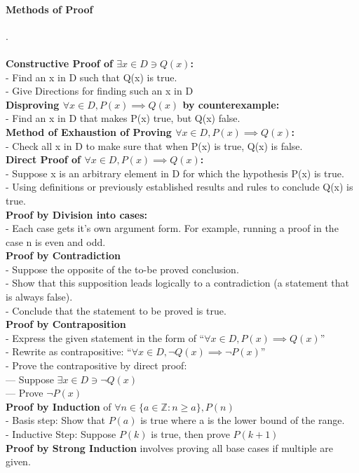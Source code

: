 \documentclass[10pt,letterpaper]{article}
\begin{document}
\begin{multicols}{2}
\paragraph{Methods of Proof}.\\\\
\textbf{Constructive Proof of $\exists x\in D \ni Q(x)$:}\\
- Find an x in D such that Q(x) is true.\\
- Give Directions for finding such an x in D\\
\textbf{Disproving $\forall x \in D, P(x) \implies Q(x)$ by counterexample:}\\
- Find an x in D that makes P(x) true, but Q(x) false.\\
\textbf{Method of Exhaustion of Proving $\forall x \in D, P(x) \implies Q(x)$:}\\
- Check all x in D to make sure that when P(x) is true, Q(x) is false.\\
\textbf{Direct Proof of $\forall x \in D, P(x) \implies Q(x)$:}\\
- Suppose x is an arbitrary element in D for which the hypothesis P(x) is true.\\
- Using definitions or previously established results and rules to conclude Q(x) is true.\\
\textbf{Proof by Division into cases:}\\
- Each case gets it's own argument form. For example, running a proof in the case n is even and odd.\\
\textbf{Proof by Contradiction}\\
- Suppose the opposite of the to-be proved conclusion.\\
- Show that this supposition leads logically to a contradiction (a statement that is always false).\\
- Conclude that the statement to be proved is true.\\
\textbf{Proof by Contraposition}\\
- Express the given statement in the form of ``$\forall x \in D, P(x) \implies Q(x)$''\\
- Rewrite as contrapositive: ``$\forall x \in D, \neg Q(x) \implies \neg P(x)$''\\
- Prove the contrapositive by direct proof:\\
--- Suppose $\exists x \in D \ni \neg Q(x)$\\
--- Prove $\neg P(x)$\\
\textbf{Proof by Induction} of $\forall n \in \{a \in \mathbb{Z} : n \geq a\}, P(n)$\\
- Basis step: Show that $P(a)$ is true where a is the lower bound of the range.\\
- Inductive Step: Suppose $P(k)$ is true, then prove $P(k+1)$\\
\textbf{Proof by Strong Induction} involves proving all base cases if multiple are given.


\end{multicols}
\end{document}
